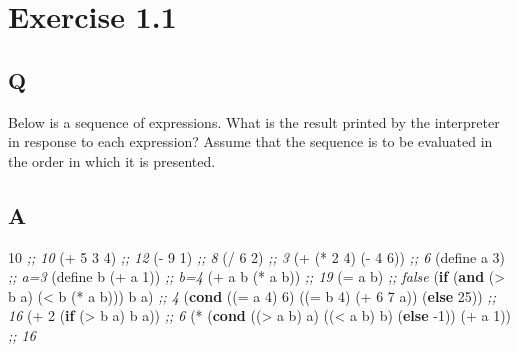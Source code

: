 \documentclass[
]{article}
\newenvironment{Shaded}{}{}
\newcommand{\CommentTok}[1]{\textcolor[rgb]{0.38,0.63,0.69}{\textit{#1}}}
\newcommand{\DecValTok}[1]{\textcolor[rgb]{0.25,0.63,0.44}{#1}}
\newcommand{\ExtensionTok}[1]{#1}
\newcommand{\FunctionTok}[1]{\textcolor[rgb]{0.02,0.16,0.49}{#1}}
\newcommand{\KeywordTok}[1]{\textcolor[rgb]{0.00,0.44,0.13}{\textbf{#1}}}
\newcommand{\NormalTok}[1]{#1}
\newcommand{\OperatorTok}[1]{\textcolor[rgb]{0.40,0.40,0.40}{#1}}
\begin{document}
\hypertarget{exercise-1.1}{%
\section{Exercise 1.1}\label{exercise-1.1}}

\hypertarget{q}{%
\subsection{Q}\label{q}}

Below is a sequence of expressions. What is the result printed by the
interpreter in response to each expression? Assume that the sequence is
to be evaluated in the order in which it is presented.

\hypertarget{a}{%
\subsection{A}\label{a}}

\begin{Shaded}
\begin{Highlighting}[numbers=left,,]
\DecValTok{10} \CommentTok{;; 10}
\NormalTok{(}\OperatorTok{+} \DecValTok{5} \DecValTok{3} \DecValTok{4}\NormalTok{) }\CommentTok{;; 12}
\NormalTok{(}\OperatorTok{{-}} \DecValTok{9} \DecValTok{1}\NormalTok{) }\CommentTok{;; 8}
\NormalTok{(}\OperatorTok{/} \DecValTok{6} \DecValTok{2}\NormalTok{) }\CommentTok{;; 3}
\NormalTok{(}\OperatorTok{+}\NormalTok{ (}\OperatorTok{*} \DecValTok{2} \DecValTok{4}\NormalTok{) (}\OperatorTok{{-}} \DecValTok{4} \DecValTok{6}\NormalTok{)) }\CommentTok{;; 6}
\NormalTok{(}\ExtensionTok{define}\FunctionTok{ a }\DecValTok{3}\NormalTok{) }\CommentTok{;; a=3}
\NormalTok{(}\ExtensionTok{define}\FunctionTok{ b }\NormalTok{(}\OperatorTok{+}\NormalTok{ a }\DecValTok{1}\NormalTok{)) }\CommentTok{;; b=4}
\NormalTok{(}\OperatorTok{+}\NormalTok{ a b (}\OperatorTok{*}\NormalTok{ a b)) }\CommentTok{;; 19}
\NormalTok{(}\OperatorTok{=}\NormalTok{ a b) }\CommentTok{;; false}
\NormalTok{(}\KeywordTok{if}\NormalTok{ (}\KeywordTok{and}\NormalTok{ (}\OperatorTok{\textgreater{}}\NormalTok{ b a) (}\OperatorTok{\textless{}}\NormalTok{ b (}\OperatorTok{*}\NormalTok{ a b)))}
\NormalTok{    b}
\NormalTok{    a) }\CommentTok{;; 4}
\NormalTok{(}\KeywordTok{cond}\NormalTok{ ((}\OperatorTok{=}\NormalTok{ a }\DecValTok{4}\NormalTok{) }\DecValTok{6}\NormalTok{)}
\NormalTok{      ((}\OperatorTok{=}\NormalTok{ b }\DecValTok{4}\NormalTok{) (}\OperatorTok{+} \DecValTok{6} \DecValTok{7}\NormalTok{ a))}
\NormalTok{      (}\KeywordTok{else} \DecValTok{25}\NormalTok{)) }\CommentTok{;; 16}
\NormalTok{(}\OperatorTok{+} \DecValTok{2}\NormalTok{ (}\KeywordTok{if}\NormalTok{ (}\OperatorTok{\textgreater{}}\NormalTok{ b a) b a)) }\CommentTok{;; 6}
\NormalTok{(}\OperatorTok{*}\NormalTok{ (}\KeywordTok{cond}\NormalTok{ ((}\OperatorTok{\textgreater{}}\NormalTok{ a b) a)}
\NormalTok{         ((}\OperatorTok{\textless{}}\NormalTok{ a b) b)}
\NormalTok{         (}\KeywordTok{else}\NormalTok{ {-}}\DecValTok{1}\NormalTok{))}
\NormalTok{   (}\OperatorTok{+}\NormalTok{ a }\DecValTok{1}\NormalTok{)) }\CommentTok{;; 16}
\end{Highlighting}
\end{Shaded}
\end{document}
